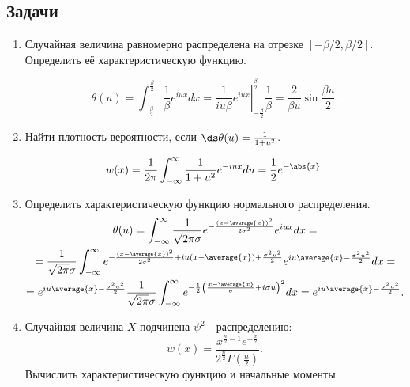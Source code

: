 \subsection{Задачи}
\begin{enumerate}
    \item Случайная величина равномерно распределена на отрезке
        \( [-\beta/2, \beta/2] \). Определить её характеристическую функцию.

        \[
            \theta(u) = \int_{-\frac{\beta}{2}}^\frac{\beta}{2} \frac{1}{\beta}
            e^{iux}dx = \left.\frac{1}{iu\beta}
            e^{iux}\right|_{-\frac{\beta}{2}}^\frac{\beta}{2} \frac{1}{\beta} =
            \frac{2}{\beta u}\sin\frac{\beta u}{2}.
        \]
    \item Найти плотность вероятности, если
        \( \ds \theta(u) = \frac{1}{1+u^2} \).

        \[
            w(x) = \frac{1}{2\pi}\int_{-\infty}^\infty
            \frac{1}{1+u^2} e^{-iux} du = \frac{1}{2}e^{-\abs{x}}.
        \]
    \item Определить характеристическую функцию нормального распределения.
        \begin{gather*}
            \theta(u) = \int_{-\infty}^\infty \frac{1}{\sqrt{2\pi}\sigma}
            e^{-\frac{(x-\average{x})^2}{2\sigma^2}} e^{iux} dx
            =\\=
            \frac{1}{\sqrt{2\pi}\sigma} \int_{-\infty}^\infty
            e^{-\frac{(x-\average{x})^2}{2\sigma^2} + iu(x-\average{x}) +
            \frac{\sigma^2u^2}{2}} e^{iu\average{x} - \frac{\sigma^2u^2}{2}} dx
            =\\=
            e^{iu\average{x} - \frac{\sigma^2u^2}{2}}
            \frac{1}{\sqrt{2\pi}\sigma}\int_{-\infty}^\infty
            e^{-\frac{1}{2}\left(\frac{x-\average{x}}{\sigma} + i\sigma
            u\right)^2} dx = e^{iu\average{x} - \frac{\sigma^2u^2}{2}}.
        \end{gather*}
    \item Случайная величина \( X \) подчинена \( \psi^2 \) - распределению:
        \[
            w(x) = \frac{x^{\frac{n}{2}-1}e^{-\frac{x}{2}}}
            {2^\frac{n}{2}\Gamma\left(\frac{n}{2}\right)}.
        \]
        Вычислить характеристическую функцию и начальные моменты.


\end{enumerate}
